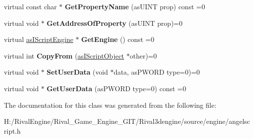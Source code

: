 \begin{DoxyCompactItemize}
virtual const char $\ast$ {\bfseries Get\+Property\+Name} (as\+U\+I\+NT prop) const =0
\item 
\mbox{\label{classas_i_script_object_a6a8a3c7d1e103e43923614b719e3cb3a}} 
virtual void $\ast$ {\bfseries Get\+Address\+Of\+Property} (as\+U\+I\+NT prop)=0
\item 
\mbox{\label{classas_i_script_object_a5dda2d380ae1580e15ddf9d95893c57a}} 
virtual \hyperlink{classas_i_script_engine}{as\+I\+Script\+Engine} $\ast$ {\bfseries Get\+Engine} () const =0
\item 
\mbox{\label{classas_i_script_object_afda786c03b02710ac4d16692ebf0ad05}} 
virtual int {\bfseries Copy\+From} (\hyperlink{classas_i_script_object}{as\+I\+Script\+Object} $\ast$other)=0
\item 
\mbox{\label{classas_i_script_object_ac85cea9bca5dd3868e027285e44dd6d0}} 
virtual void $\ast$ {\bfseries Set\+User\+Data} (void $\ast$data, as\+P\+W\+O\+RD type=0)=0
\item 
\mbox{\label{classas_i_script_object_a63e8ab74fd7552d057e23e0ce550a157}} 
virtual void $\ast$ {\bfseries Get\+User\+Data} (as\+P\+W\+O\+RD type=0) const =0
\end{DoxyCompactItemize}


The documentation for this class was generated from the following file\+:\begin{DoxyCompactItemize}
\item 
H\+:/\+Rival\+Engine/\+Rival\+\_\+\+Game\+\_\+\+Engine\+\_\+\+G\+I\+T/\+Rival3dengine/source/engine/angelscript.\+h\end{DoxyCompactItemize}
